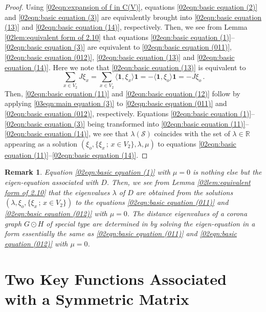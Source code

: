 \documentclass[12pt,a4paper]{article}
\newtheorem{remark}[theorem]{Remark}
\newcommand{\1}{{\bm 1}}
\numberwithin{equation}{section}
\begin{document}
\begin{proof}
Using \eqref{02eqn:expansion of f in C(V)}, equations
\eqref{02eqn:basic equation (2)} and \eqref{02eqn:basic equation (3)}
are equivalently brought into
\eqref{02eqn:basic equation (13)}
and \eqref{02eqn:basic equation (14)}, respectively.
Then, we see from  Lemma \ref{02lem:equivalent form of 2.10}
that equations 
\eqref{02eqn:basic equation (1)}--\eqref{02eqn:basic equation (3)}
are equivalent to
\eqref{02eqn:basic equation (011)},
\eqref{02eqn:basic equation (012)},
\eqref{02eqn:basic equation (13)} and 
\eqref{02eqn:basic equation (14)}.
Here we note that \eqref{02eqn:basic equation (13)} is equivalent to
%
\begin{equation}\label{03eqn:main equation (3)}
\sum_{x\in V_2}J\xi_x
=\sum_{x\in V_2}\langle \mathbf{1},\xi_x \rangle\mathbf{1}
=-\langle \mathbf{1},\xi_o \rangle\mathbf{1}
=-J\xi_o\,.
\end{equation}
%
Then, \eqref{02eqn:basic equation (11)}
and \eqref{02eqn:basic equation (12)} follow
by applying \eqref{03eqn:main equation (3)}
to \eqref{02eqn:basic equation (011)} and
\eqref{02eqn:basic equation (012)}, respectively.
Equations
\eqref{02eqn:basic equation (1)}--\eqref{02eqn:basic equation (3)}
being transformed into 
\eqref{02eqn:basic equation (11)}--\eqref{02eqn:basic equation (14)},
we see that $\lambda(\mathcal{S})$ coincides with
the set of $\lambda\in\mathbb{R}$ appearing
as a solution $(\xi_o,\{\xi_x\,;\, x\in V_2\}, \lambda, \mu)$
to equations
\eqref{02eqn:basic equation (11)}--\eqref{02eqn:basic equation (14)}.
\end{proof}

\begin{remark}\normalfont
Equation \eqref{02eqn:basic equation (1)} with $\mu=0$ is
nothing else but the eigen-equation associated with $D$.
Then, we see from Lemma \ref{02lem:equivalent form of 2.10}
that the eigenvalues $\lambda$ of $D$ are obtained
from the solutions $(\lambda,\xi_o,\{\xi_x\,;\,x\in V_2\})$ to
the equations \eqref{02eqn:basic equation (011)}
and \eqref{02eqn:basic equation (012)} with $\mu=0$.
The distance eigenvalues of a corona graph $G\odot H$ of
special type are determined in \cite{Indulal-Stevanovic2015}
by solving the eigen-equation in a form essentially
the same as \eqref{02eqn:basic equation (011)}
and \eqref{02eqn:basic equation (012)} with $\mu=0$.
\end{remark}
 

\section{Two Key Functions Associated with a Symmetric Matrix}
\end{document}
